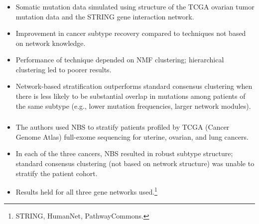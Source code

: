 \begin{frame}[fragile] \frametitle{}
    \begin{itemize}
        \item Somatic mutation data simulated using structure of the TCGA
            ovarian tumor mutation data and the STRING gene interaction network.
        \item Improvement in cancer subtype recovery compared to techniques not
            based on network knowledge.
        \item Performance of technique depended on NMF clustering; hierarchical
            clustering led to poorer results.
        \item Network-based stratification outperforms standard consensus
            clustering when there is less likely to be substantial overlap
            in mutations among patients of the same subtype (e.g., lower
            mutation frequencies, larger network modules).
    \end{itemize}
\end{frame}
\fi
\begin{frame}[fragile] \frametitle{}
    \begin{itemize}
        \item The authors used NBS to stratify patients profiled by TCGA
            (Cancer Genome Atlas) full-exome sequencing for uterine,
            ovarian, and lung cancers.
        \item In each of the three cancers, NBS resulted in robust subtype
            structure; standard consensus clustering (not based on network
            structure) was unable to stratify the patient cohort.
        \item Results held for all three gene networks used.\footnote{
                STRING, HumanNet, PathwayCommons.
                \vspace{0.2cm}
            }
    \end{itemize}
\end{frame}
